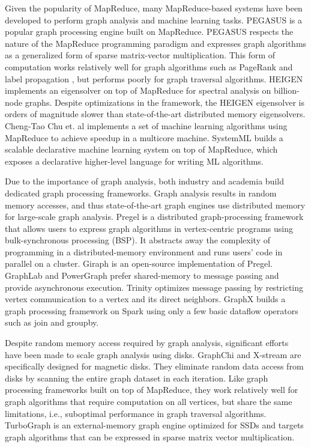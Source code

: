 Given the popularity of MapReduce, many MapReduce-based systems have been
developed to perform graph analysis and machine learning tasks. PEGASUS
\cite{pegasus} is a popular graph processing engine built on MapReduce.
PEGASUS respects the nature of the MapReduce programming paradigm and
expresses
graph algorithms as a generalized form of sparse matrix-vector multiplication.
This form of computation works relatively well for graph algorithms such as
PageRank \cite{pagerank} and label propagation \cite{label_prop}, but performs
poorly for graph traversal algorithms. HEIGEN \cite{heigen} implements
an eigensolver on top of MapReduce for spectral analysis on billion-node
graphs. Despite optimizations in the framework, the HEIGEN eigensolver is
orders of magnitude slower than state-of-the-art distributed memory eigensolvers.
Cheng-Tao Chu et. al \cite{Chu07} implements a set of machine learning
algorithms using MapReduce to achieve speedup in a multicore machine. SystemML
\cite{systemml} builds a scalable declarative machine learning system on top
of MapReduce, which exposes a declarative higher-level language for writing
ML algorithms.

Due to the importance of graph analysis, both industry and academia build
dedicated graph processing frameworks. Graph analysis results in random memory
accesses, and thus state-of-the-art graph engines use
distributed memory for large-scale graph analysis.
Pregel \cite{pregel} is a distributed graph-processing framework that
allows users to express graph algorithms in vertex-centric programs  
using bulk-synchronous processing (BSP).
It abstracts away the complexity of programming in a distributed-memory 
environment and runs users' code in parallel on a cluster.
Giraph \cite{giraph} is an open-source implementation of Pregel.
GraphLab \cite{graphlab} and PowerGraph \cite{powergraph} prefer shared-memory
to message passing and provide asynchronous execution.
Trinity \cite{trinity} optimizes message passing by restricting vertex
communication to a vertex and its direct neighbors. GraphX \cite{graphx}
builds a graph processing framework on Spark using only a few basic dataflow
operators such as join and groupby.

Despite random memory access required by graph analysis, significant efforts
have been made to scale graph analysis using disks. GraphChi \cite{graphchi}
and X-stream \cite{xstream} are specifically designed for magnetic disks. They
eliminate random data access from disks by scanning the entire graph dataset
in each iteration. Like graph processing frameworks built on top of MapReduce,
they work relatively well for graph algorithms that require computation on all
vertices, but share the same limitations, i.e., suboptimal performance in graph
traversal algorithms. TurboGraph \cite{turbograph} is an external-memory graph
engine optimized for SSDs and targets graph algorithms that can be
expressed in sparse matrix vector multiplication.

